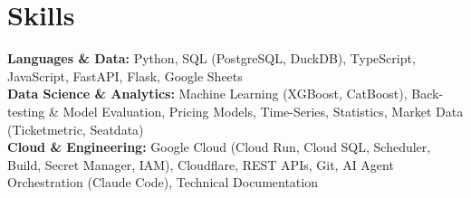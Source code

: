\documentclass[10pt,letterpaper]{article}
\newcommand{\lead}[1]{\textbf{#1:}}
\begin{document}
\section{Skills}

\lead{Languages \& Data} Python, SQL (PostgreSQL, DuckDB), TypeScript, JavaScript, FastAPI, Flask, Google Sheets\\[2pt]
\lead{Data Science \& Analytics} Machine Learning (XGBoost, CatBoost), Back-testing \& Model Evaluation, Pricing
Models, Time-Series, Statistics, Market Data (Ticketmetric, Seatdata)\\[2pt]
\lead{Cloud \& Engineering} Google Cloud (Cloud Run, Cloud SQL, Scheduler, Build, Secret Manager, IAM),
Cloudflare, REST APIs, Git, AI Agent Orchestration (Claude Code), Technical Documentation
\end{document}
